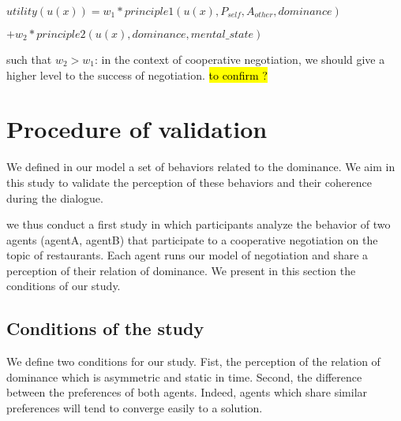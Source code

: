\documentclass{article}
\begin{document}
$utility(u(x)) = w_1 * principle1(u(x),P_{self},A_{other},dominance)$

             $ + w_2 * principle2(u(x),dominance,mental\_state)$

such that $w_2 > w_1$: in the context of cooperative negotiation, we should give a higher level to the success of negotiation. \hl{ to confirm ?}

\section{Procedure of validation}
We defined in our model a set of behaviors related to the dominance. We aim in this study to validate the perception of these behaviors and their coherence during the dialogue.
\par we thus conduct a first study in which participants analyze the behavior of  two agents (agentA, agentB)  that participate to a cooperative negotiation on the topic of restaurants. Each agent runs our model of negotiation and share a perception of their relation of dominance. We present in this section the conditions of our study.

\subsection{Conditions of the study}
We define two conditions for our study. Fist, the perception of the relation of dominance which is asymmetric and static in time. Second, the difference between the preferences of both agents. Indeed, agents which share similar preferences will tend to converge easily to a solution. 



\vskip 4pt


\end{document}
